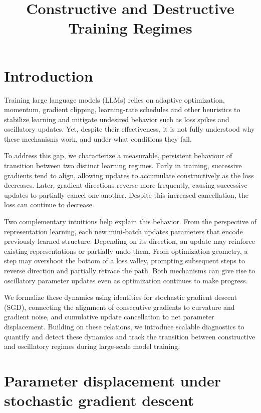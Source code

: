 \documentclass[11pt]{article}
\title{Constructive and Destructive Training Regimes}
\author{}
\date{}
\begin{document}
\maketitle
\vspace{-2em}

\section{Introduction}

Training large language models (LLMs) relies on adaptive optimization, momentum, gradient clipping, learning-rate schedules and other heuristics to stabilize learning and mitigate undesired behavior such as loss spikes and oscillatory updates. Yet, despite their effectiveness, it is not fully understood why these mechanisms work, and under what conditions they fail.

To address this gap, we characterize a measurable, persistent behaviour of transition between two distinct learning regimes. Early in training, successive gradients tend to align, allowing updates to accumulate constructively as the loss decreases. Later, gradient directions reverse more frequently, causing successive updates to partially cancel one another. Despite this increased cancellation, the loss can continue to decrease.

Two complementary intuitions help explain this behavior. From the perspective of representation learning, each new mini-batch updates parameters that encode previously learned structure. Depending on its direction, an update may reinforce existing representations or partially undo them. From optimization geometry, a step may overshoot the bottom of a loss valley, prompting subsequent steps to reverse direction and partially retrace the path. Both mechanisms can give rise to oscillatory parameter updates even as optimization continues to make progress.

We formalize these dynamics using identities for stochastic gradient descent (SGD), connecting the alignment of consecutive gradients to curvature and gradient noise, and cumulative update cancellation to net parameter displacement. Building on these relations, we introduce scalable diagnostics to quantify and detect these dynamics and track the transition between constructive and oscillatory regimes during large-scale model training.


\section{Parameter displacement under stochastic gradient descent}
\end{document}
